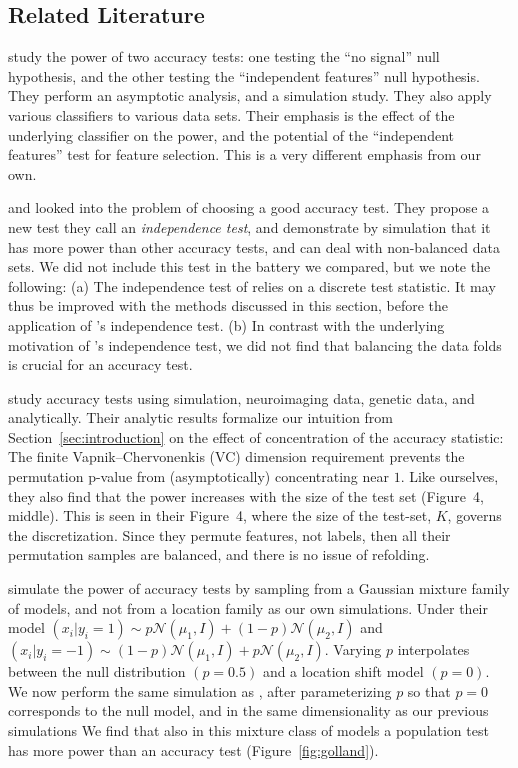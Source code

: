 \documentclass[12pt,a4paper]{article}
\theoremstyle{definition}
\newcommand{\gauss}[1]{\mathcal{N}\left(#1\right)} %
\begin{document}
\subsection{Related Literature}
\cite{ojala_permutation_2010} study the power of two accuracy tests: one testing the ``no signal'' null hypothesis, and the other testing the ``independent features'' null hypothesis. 
They perform an asymptotic analysis, and a simulation study. 
They also apply various classifiers to various data sets. 
Their emphasis is the effect of the underlying classifier on the power, and the potential of the ``independent features'' test for feature selection.
This is a very different emphasis from our own.


\cite{olivetti_induction_2012} and \cite{olivetti_statistical_2014} looked into the problem of choosing a good accuracy test. 
They propose a new test they call an \emph{independence test}, and demonstrate by simulation that it has more power than other accuracy tests, and can deal with non-balanced data sets. 
We did not include this test in the battery we compared, but we note the following: 
(a) The independence test of \cite{olivetti_induction_2012} relies on a discrete test statistic. It may thus be improved with the methods discussed in this section, before the application of \cite{olivetti_induction_2012}'s independence test. 
(b) In contrast with the underlying motivation of \cite{olivetti_induction_2012}'s independence test, we did not find that balancing the data folds is crucial for an accuracy test. 


\cite{golland_permutation_2005} study accuracy tests using simulation, neuroimaging data, genetic data, and analytically.
Their analytic results formalize our intuition from Section~\ref{sec:introduction} on the effect of concentration of the accuracy statistic:
The finite Vapnik–Chervonenkis (VC) dimension requirement \citep[Sec 4.3]{golland_permutation_2003} prevents the permutation p-value from (asymptotically) concentrating near $1$. 
Like ourselves, they also find that the power increases with the size of the test set (Figure~4, middle). 
This is seen in their Figure~4, where the size of the test-set, $K$, governs the discretization. 
Since they permute features, not labels, then all their permutation samples are balanced, and there is no issue of refolding. 

\cite{golland_permutation_2005} simulate the power of accuracy tests by sampling from a Gaussian mixture family of models, and not from a location family as our own simulations. 
Under their model 
$(x_i|y_i=1) \sim p \gauss{\mu_1,I}+ (1-p) \gauss{\mu_2,I}$ 
and 
$(x_i|y_i=-1) \sim (1-p) \gauss{\mu_1,I}+ p \gauss{\mu_2,I}$.
Varying $p$ interpolates between the null distribution $(p=0.5)$ and a location shift model $(p=0)$. 
We now perform the same simulation as \cite{golland_permutation_2005}, after parameterizing $p$ so that $p=0$ corresponds to the null model, and in the same dimensionality as our previous simulations
We find that also in this mixture class of models a population test has more power than an accuracy test (Figure~\ref{fig:golland}).
\end{document}
